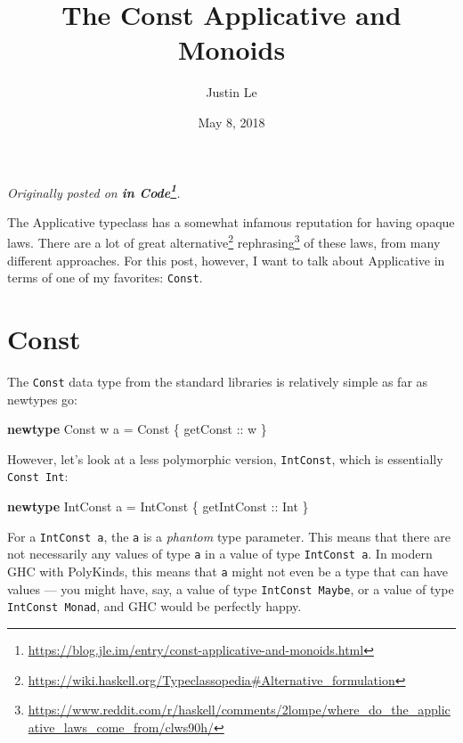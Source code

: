 \documentclass[]{article}
\title{The Const Applicative and Monoids}
\author{Justin Le}
\date{May 8, 2018}
\newenvironment{Shaded}{}{}
\newcommand{\DataTypeTok}[1]{\textcolor[rgb]{0.56,0.13,0.00}{#1}}
\newcommand{\FunctionTok}[1]{\textcolor[rgb]{0.02,0.16,0.49}{#1}}
\newcommand{\KeywordTok}[1]{\textcolor[rgb]{0.00,0.44,0.13}{\textbf{#1}}}
\newcommand{\NormalTok}[1]{#1}
\newcommand{\OtherTok}[1]{\textcolor[rgb]{0.00,0.44,0.13}{#1}}
\renewcommand{\href}[2]{#2\footnote{\url{#1}}}
\begin{document}
\maketitle

\emph{Originally posted on
\textbf{\href{https://blog.jle.im/entry/const-applicative-and-monoids.html}{in
Code}}.}

The Applicative typeclass has a somewhat infamous reputation for having opaque
laws. There are a lot of great
\href{https://wiki.haskell.org/Typeclassopedia\#Alternative_formulation}{alternative}
\href{https://www.reddit.com/r/haskell/comments/2lompe/where_do_the_applicative_laws_come_from/clws90h/}{rephrasing}
of these laws, from many different approaches. For this post, however, I want to
talk about Applicative in terms of one of my favorites: \texttt{Const}.

\hypertarget{const}{%
\section{Const}\label{const}}

The \texttt{Const} data type from the standard libraries is relatively simple as
far as newtypes go:

\begin{Shaded}
\begin{Highlighting}[]
\KeywordTok{newtype} \DataTypeTok{Const}\NormalTok{ w a }\FunctionTok{=} \DataTypeTok{Const}\NormalTok{ \{}\OtherTok{ getConst ::}\NormalTok{ w \}}
\end{Highlighting}
\end{Shaded}

However, let's look at a less polymorphic version, \texttt{IntConst}, which is
essentially \texttt{Const\ Int}:

\begin{Shaded}
\begin{Highlighting}[]
\KeywordTok{newtype} \DataTypeTok{IntConst}\NormalTok{ a }\FunctionTok{=} \DataTypeTok{IntConst}\NormalTok{ \{}\OtherTok{ getIntConst ::} \DataTypeTok{Int}\NormalTok{ \}}
\end{Highlighting}
\end{Shaded}

For a \texttt{IntConst\ a}, the \texttt{a} is a \emph{phantom} type parameter.
This means that there are not necessarily any values of type \texttt{a} in a
value of type \texttt{IntConst\ a}. In modern GHC with PolyKinds, this means
that \texttt{a} might not even be a type that can have values --- you might
have, say, a value of type \texttt{IntConst\ Maybe}, or a value of type
\texttt{IntConst\ Monad}, and GHC would be perfectly happy.
\end{document}
